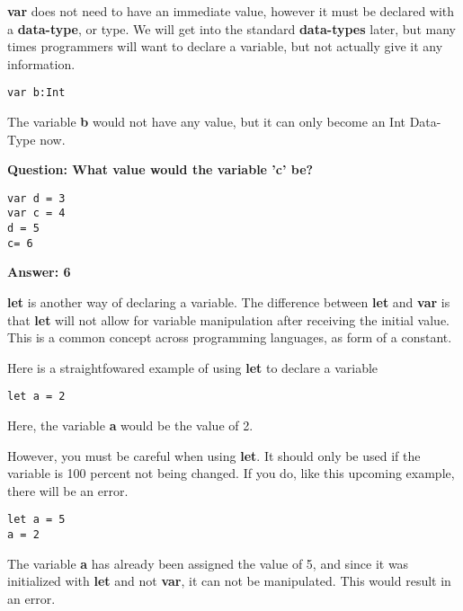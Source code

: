 \documentclass{article}
\theoremstyle{theorem}
\theoremstyle{definition}
\theoremstyle{remark}
\begin{document}
\noindent\newline\newline \textbf{var} does not need to have an immediate value, however it must be declared with a \textbf{data-type}, or type. We will get into the standard \textbf{data-types} later, but many times programmers will want to declare a variable, but not actually give it any information.

\begin{verbatim}
var b:Int
\end{verbatim}
\noindent The variable \textbf{b} would not have any value, but it can only become an Int Data-Type now. 

\noindent\newline\newline \textbf{Question: What value would the variable 'c' be?}
\begin{verbatim}
var d = 3
var c = 4
d = 5
c= 6
\end{verbatim}

\noindent\newline \textbf{Answer: 6}


\noindent\newline\newline \textbf{let} is another way of declaring a variable. The difference between \textbf{let} and \textbf{var} is that \textbf{let} will not allow for variable manipulation after receiving the initial value. This is a common concept across programming languages, as form of a constant. 

\noindent\newline Here is a straightfowared example of using \textbf{let} to declare a variable
\begin{verbatim}
let a = 2
\end{verbatim}

\noindent\newline Here, the variable \textbf{a} would be the value of 2.

\noindent\newline\newline However, you must be careful when using \textbf{let}. It should only be used if the variable is 100 percent not being changed. If you do, like this upcoming example, there will be an error.
\begin{verbatim}
let a = 5
a = 2
\end{verbatim}
\noindent\newline The variable \textbf{a} has already been assigned the value of 5, and since it was initialized with \textbf{let} and not \textbf{var}, it can not be manipulated. This would result in an error.
\end{document}
